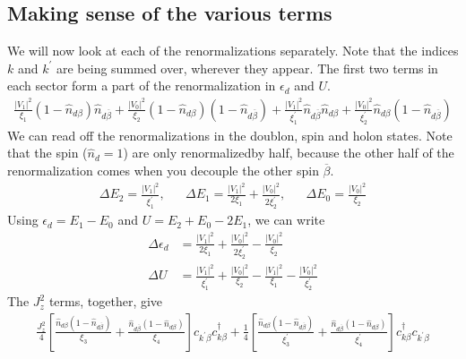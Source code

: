 \documentclass[twoside,11pt]{report}
\numberwithin{equation}{section}
\begin{document}
\subsection{Making sense of the various terms}
We will now look at each of the renormalizations separately. Note that the indices \(k\) and \(k^\prime\) are being summed over, wherever they appear. The first two terms in each sector form a part of the renormalization in \(\epsilon_d\) and \(U\).
\begin{equation}\begin{aligned}
\frac{|V_1|^2}{\xi_1}\left( 1 - \hat n_{d\beta} \right) \hat n_{d\overline\beta} + \frac{|V_0|^2}{\xi_2}\left( 1 - \hat n_{d\beta} \right) \left( 1 - \hat n_{d\overline\beta} \right) + \frac{|V_1|^2}{\xi^\prime_1}\hat n_{d\overline\beta}\hat n_{d\beta} + \frac{|V_0|^2}{\xi^\prime_2}\hat n_{d\beta}\left(1 - \hat n_{d\overline\beta}\right)
\end{aligned}\end{equation}
We can read off the renormalizations in the doublon, spin and holon states. Note that the spin (\(\hat n_{d}=1\)) are only renormalizedby half, because the other half of the renormalization comes when you decouple the other spin \(\overline\beta\).
\begin{equation}\begin{aligned}
	\Delta E_2 = \frac{|V_1|^2}{\xi^\prime_1}, && \Delta E_1 =\frac{|V_1|^2}{2\xi_1} + \frac{|V_0|^2}{2\xi_2^\prime}, && \Delta E_0 = \frac{|V_0|^2}{\xi_2}
\end{aligned}\end{equation}
Using \(\epsilon_d = E_1 - E_0\) and \(U = E_2 + E_0 - 2E_1\), we can write
\begin{equation}\begin{aligned}
	\label{edU}
	\Delta \epsilon_d &= \frac{|V_1|^2}{2\xi_1} + \frac{|V_0|^2}{2\xi_2^\prime} - \frac{|V_0|^2}{\xi_2}\\
	\Delta U &= \frac{|V_1|^2}{\xi_1^\prime} + \frac{|V_0|^2}{\xi_2} - \frac{|V_1|^2}{\xi_1} - \frac{|V_0|^2}{\xi_2^\prime}
\end{aligned}\end{equation}
The \(J_z^2\) terms, together, give
\begin{equation}\begin{aligned}
\frac{J_z^2}{4}\left[\frac{\hat n_{d\beta}\left( 1 - \hat n_{d\overline\beta} \right) }{\xi_3} + \frac{\hat n_{d\overline\beta}\left( 1 - \hat n_{d\beta} \right)}{\xi_4} \right]c_{k^\prime\beta}c^\dagger_{k\beta} +\frac{1}{4}\left[ \frac{\hat n_{d\beta}\left( 1 - \hat n_{d\overline\beta} \right) }{\xi^\prime_3} + \frac{\hat n_{d\overline\beta}\left( 1 - \hat n_{d\beta} \right)}{\xi^\prime_4} \right]c^\dagger_{k\beta}c_{k^\prime\beta}
\end{aligned}\end{equation}
\end{document}
